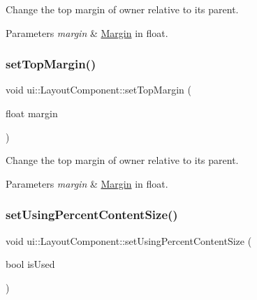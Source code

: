 Change the top margin of owner relative to its parent. 
\begin{DoxyParams}{Parameters}
{\em margin} & \hyperlink{classui_1_1Margin}{Margin} in float. \\
\hline
\end{DoxyParams}
\mbox{\label{classui_1_1LayoutComponent_a3f88a5fedef99e54d7a78794f4bd193a}} 
\subsubsection{\texorpdfstring{set\+Top\+Margin()}{setTopMargin()}\hspace{0.1cm}{\footnotesize\ttfamily [2/2]}}
{\footnotesize\ttfamily void ui\+::\+Layout\+Component\+::set\+Top\+Margin (\begin{DoxyParamCaption}\item[{float}]{margin }\end{DoxyParamCaption})}

Change the top margin of owner relative to its parent. 
\begin{DoxyParams}{Parameters}
{\em margin} & \hyperlink{classui_1_1Margin}{Margin} in float. \\
\hline
\end{DoxyParams}
\mbox{\label{classui_1_1LayoutComponent_a1b647bfd14f2c29fd9790e0aa753bf26}} 
\subsubsection{\texorpdfstring{set\+Using\+Percent\+Content\+Size()}{setUsingPercentContentSize()}\hspace{0.1cm}{\footnotesize\ttfamily [1/2]}}
{\footnotesize\ttfamily void ui\+::\+Layout\+Component\+::set\+Using\+Percent\+Content\+Size (\begin{DoxyParamCaption}\item[{bool}]{is\+Used }\end{DoxyParamCaption})}

